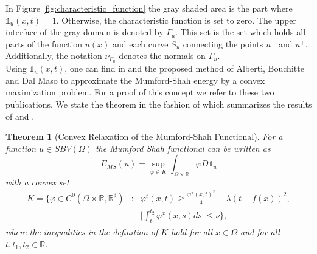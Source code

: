 \documentclass[abstracton]{scrreprt}
\newtheorem{theorem}{Theorem}[chapter]
\begin{document}
        In Figure \ref{fig:characteristic_function} the gray shaded area is the part where $\mathds{1}_{u}(x, t) = 1$. Otherwise, the characteristic function is set to zero. The upper interface of the gray domain is denoted by $\Gamma_{u}$. This set is the set which holds all parts of the function $u(x)$ and each curve $S_{u}$ connecting the points $u^{-}$ and $u^{+}$. Additionally, the notation $\nu_{\Gamma_{u}}$ denotes the normals on $\Gamma_{u}$.\\

        Using $\mathds{1}_{u}(x, t)$, one can find in \cite{Alberti-et-al-lnss} and \cite{Alberti-et-al-cvpde} the proposed method of Alberti, Bouchitte and Dal Maso to approximate the Mumford-Shah energy by a convex maximization problem. For a proof of this concept we refer to these two publications. We state the theorem in the fashion of \cite{Pock-et-al-iccv09} which summarizes the results of \cite{Alberti-et-al-lnss} and \cite{Alberti-et-al-cvpde}.
        \begin{theorem}[Convex Relaxation of the Mumford-Shah Functional]
        \label{convex_relaxation_of_the_mumford_shah_functional}
            For a function $u \in SBV(\Omega)$ the Mumford Shah functional can be written as
                \begin{equation}
                    E_{MS}(u) = \sup_{\varphi \in K} \int_{\Omega \times \mathbb{R}} \varphi D\mathds{1}_{u}
                    \label{eq:convex_relaxed_ms}
                \end{equation}
            with a convex set
                \begin{eqnarray}
                    K = \bigg\{ \varphi \in C^{0}(\Omega \times \mathbb{R}, \mathbb{R}^{3}) &:& \varphi^{t}(x, t) \ge \frac{\varphi^{x}(x,t)^{2}}{4} - \lambda(t - f(x))^{2}, \\
                    &&\bigg| \int^{t_{2}}_{t_{1}} \varphi^{x}(x,s)ds \bigg| \le \nu \bigg\}, \label{eq:set_k_continuous}
                \end{eqnarray}
            where the inequalities in the definition of $K$ hold for all $x \in \Omega$ and for all $t, t_{1}, t_{2} \in \mathbb{R}$.
        \end{theorem}
\end{document}
